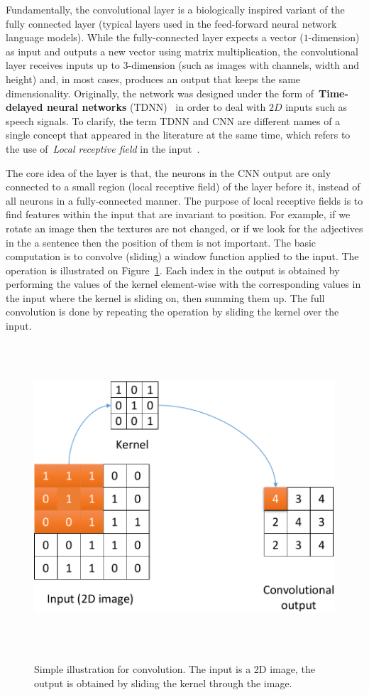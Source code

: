 Fundamentally, the convolutional layer is a biologically inspired variant of the fully connected layer (typical layers used in the feed-forward neural network language models). While the fully-connected layer expects a vector ($1$-dimension) as input and outputs a new vector using matrix multiplication, the convolutional layer receives inputs up to $3$-dimension (such as images with channels, width and height) and, in most cases, produces an output that keeps the same dimensionality. Originally, the network was designed under the form of~\textbf{Time-delayed neural networks} (TDNN)~\cite{waibel1989phoneme} in order to deal with $2D$ inputs such as speech signals. To clarify, the term TDNN and CNN are different names of a single concept that appeared in the literature at the same time, which refers to the use of~\textit{Local receptive field} in the input~\cite{fukushima1980neocognitron,serre2007robust}. 

The core idea of the layer is that, the neurons in the CNN output are only connected to a small region (local receptive field) of the layer before it, instead of all neurons in a fully-connected manner. The purpose of local receptive fields is to find features within the input that are invariant to position. For example, if we rotate an image then the textures are not changed, or if we look for the adjectives in the a sentence then the position of them is not important. The basic computation is to convolve (sliding) a window function applied to the input. The operation is illustrated on Figure~\ref{fig:conv_ops}. Each index in the output is obtained by performing the values of the kernel element-wise with the corresponding values in the input where the kernel is sliding on, then summing them up. The full convolution is done by repeating the operation by sliding the kernel over the input.


~ \begin{figure}
	~ \centering
	~ \includegraphics[width=\columnwidth/2]{figures/conv_ops.pdf}
	~ \caption{Simple illustration for convolution. The input is a 2D image, the output is obtained by sliding the kernel through the image.}  
	~ \label{fig:conv_ops}
	~ \end{figure}


